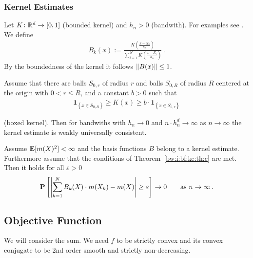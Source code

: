 \subsubsection*{Kernel Estimates}
Let $K\colon \mathbb{R}^d\to [0,1]$ (bounded kernel) and $h_n>0$ (bandwith).
For examples see \cite[§5.1.]{Gyorfi2002}.
We define
\begin{gather}
  B_k(x)
  :=
  \frac
  {
    K \left( \frac{x-X_k}{h_n} \right)
  }
  {
    \sum_{i=1}^{N} 
    K \left( \frac{x-X_i}{h_n} \right)
  }
  \,.
\end{gather}
By the boundedness of the kernel it follows
$\left\lVert B(x)\right\rVert\le 1$.
\begin{theorem}
  \label{bw:i:bf:ke:th:c}
  Assume that there are 
  balls
  $S_{0,r}$ of radius $r$ 
  and
  balls
  $S_{0,R}$ of radius $R$ 
  centered at the origin with $0<r\le R$, and a constant $b>0$ such that
  \begin{gather}
    \mathbf{1}_{\left\{ x\in S_{0,R} \right\}}
    \ge
    K(x)
    \ge
    b
    \cdot
    \mathbf{1}_{\left\{ x\in S_{0,r} \right\}}
  \end{gather}
\end{theorem}
(boxed kernel). Then for bandwiths with $h_n\to0$ and
$n\cdot h_n^d\to\infty$ as $n\to \infty$ the kernel estimate is weakly universally consistent.
\begin{corollary}
Assume
  $\mathbf{E}[m(X)^2]<\infty$
  and the basis functions $B$ belong to a kernel estimate.
  Furthermore assume that the conditions of 
  Theorem~\ref{bw:i:bf:ke:th:c} are met.
Then it holds for all $\varepsilon>0$
\begin{gather}
  \P
  \left[ 
    \left| 
    \sum_{k=1}^{N} 
    B_k(X)
    \cdot
    m(X_k)
    -
    m(X)
    \right|
    \ge
    \varepsilon
  \right]
  \to
  0
  \qquad
  \text{as}
  \ 
  n\to \infty
  \,.
\end{gather}
\end{corollary}
\subsection*{Objective Function}
We will consider the sum.
We need $f$ to be strictly convex and its convex conjugate
to be 2nd order smooth and strictly non-decreasing.
